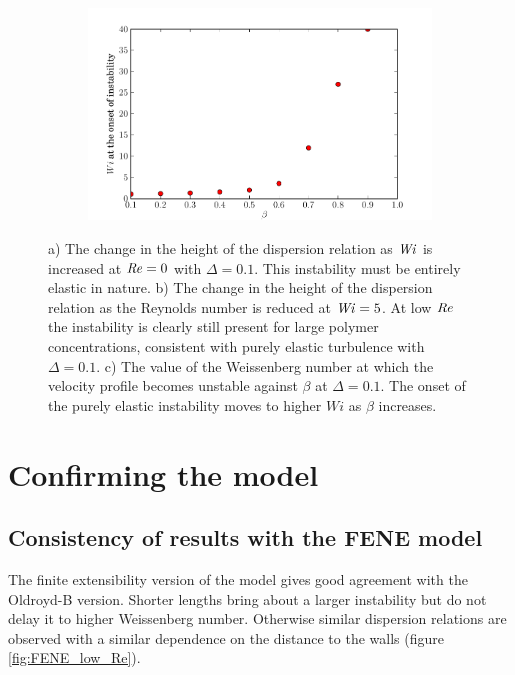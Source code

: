 \documentclass{jfm}
\newcommand\Wi{\mbox{\textit{Wi}}}
\newcommand\Rey{\mbox{\textit{Re}}}  %
\begin{document}
\begin{figure}
\begin{subfigure}[b]{0.48\textwidth}
    \centering
    \includegraphics[width=\textwidth]{KH_onset_beta_Wi}
    \caption{}
    \label{fig:KH_elastic_onset}
\end{subfigure}
\caption{
a) The change in the height of the dispersion relation as $\Wi$ is increased at
$\Rey = 0$ with $\Delta = 0.1$. This instability must be entirely elastic in
nature. b) The change in the height of the dispersion relation as the Reynolds
number is reduced at $\Wi=5$. At low $\Rey$ the instability is clearly still
present for large polymer concentrations, consistent with purely elastic
turbulence with $\Delta = 0.1$.  c) The value of the Weissenberg number at
which the velocity profile becomes unstable against $\beta$ at $\Delta = 0.1$.
The onset of the purely elastic instability moves to higher $Wi$ as $\beta$
increases.
}
\end{figure}

\section{Confirming the model}

\subsection{Consistency of results with the FENE model}

The finite extensibility version of the model gives good agreement with the
Oldroyd-B version. Shorter lengths bring about a larger instability but do not
delay it to higher Weissenberg number. Otherwise similar dispersion relations
are observed with a similar dependence on the distance to the walls (figure
\ref{fig:FENE_low_Re}).
\end{document}
